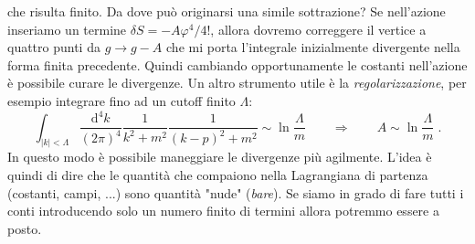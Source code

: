 \documentclass[12pt,a4paper]{article}
\theoremstyle{definition}
\numberwithin{equation}{section}
\newcommand{\diff}[1][]{\mathrm{d}#1}
\begin{document}
che risulta finito. Da dove può originarsi una simile sottrazione? Se nell'azione inseriamo un termine $\delta S=-A\varphi^4/4!$, allora dovremo correggere il vertice a quattro punti da $g\to g-A$ che mi porta l'integrale inizialmente divergente nella forma finita precedente. Quindi cambiando opportunamente le costanti nell'azione è possibile curare le divergenze. Un altro strumento utile è la \emph{regolarizzazione}, per esempio integrare fino ad un cutoff finito $\Lambda$:
$$
\int_{|k|<\Lambda}\frac{\diff^4{k}}{(2\pi)^4}\frac{1}{k^2+m^2}\frac{1}{(k-p)^2+m^2}\sim \ln\frac{\Lambda}{m}\qquad \Longrightarrow\qquad A\sim \ln\frac{\Lambda}{m}\;.
$$
In questo modo è possibile maneggiare le divergenze più agilmente. L'idea è quindi di dire che le quantità che compaiono nella Lagrangiana di partenza (costanti, campi, ...) sono quantità "nude" (\emph{bare}). Se siamo in grado di fare tutti i conti introducendo solo un numero finito di termini allora potremmo essere a posto.
\end{document}
